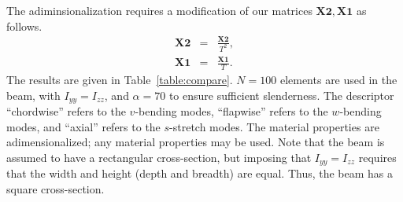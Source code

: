 The adiminsionalization requires a modification of our matrices $\mathbf{X2},\mathbf{X1}$ as follows.
\begin{eqnarray}
\mathbf{X2} &=& \frac{\mathbf{X2}}{T^2}, \\
\mathbf{X1} &=& \frac{\mathbf{X1}}{T}.
\end{eqnarray}
The results are given in Table~\ref{table:compare}. $N=100$ elements are used in the beam, with $I_{yy}=I_{zz}$, and $\alpha=70$ to ensure sufficient slenderness. The descriptor ``chordwise'' refers to the $v$-bending modes, ``flapwise'' refers to the $w$-bending modes, and ``axial'' refers to the $s$-stretch modes. The material properties are adimensionalized; any material properties may be used. Note that the beam is assumed to have a rectangular cross-section, but imposing that $I_{yy}=I_{zz}$ requires that the width and height (depth and breadth) are equal. Thus, the beam has a square cross-section. 
